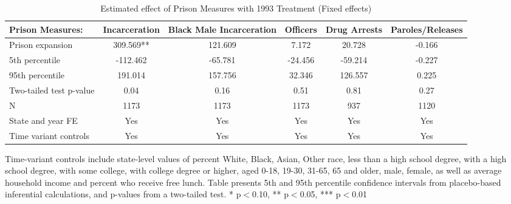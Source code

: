 \begin{table}[htbp]\centering
\scriptsize
\caption{Estimated effect of Prison Measures with 1993 Treatment (Fixed effects)}
\begin{center}
\begin{threeparttable}
\begin{tabular}{l*{5}{c}}
\toprule
\multicolumn{1}{l}{\textbf{Prison Measures:}}&
\multicolumn{1}{c}{\textbf{Incarceration}}&
\multicolumn{1}{c}{\textbf{Black Male Incarceration}}&
\multicolumn{1}{c}{\textbf{Officers}}&
\multicolumn{1}{c}{\textbf{Drug Arrests}}&
\multicolumn{1}{c}{\textbf{Paroles/Releases}}\\
\midrule
Prison expansion    &     309.569**   &     121.609   &       7.172   &      20.728   &      -0.166   \\
5th percentile      &    -112.462   &     -65.781   &     -24.456   &     -59.214   &      -0.227   \\
95th percentile     &     191.014   &     157.756   &      32.346   &     126.557   &       0.225   \\
Two-tailed test p-value&        0.04   &        0.16   &        0.51   &        0.81   &        0.27   \\
N                   &        1173   &        1173   &        1173   &         937   &        1120   \\
\midrule
State and year FE                              & Yes   & Yes   & Yes   & Yes   & Yes            \\
Time variant controls                  & Yes   & Yes   & Yes   & Yes   & Yes            \\
\bottomrule
\end{tabular}
\begin{tablenotes}
\tiny
\item Time-variant controls include state-level values of percent White, Black, Asian, Other race, less than a high school degree, with a high school degree, with some college, with college degree or higher, aged 0-18, 19-30, 31-65, 65 and older, male, female, as well as average household income and percent who receive free lunch.  Table presents 5th and 95th percentile confidence intervals from placebo-based inferential calculations, and p-values from a two-tailed test. * p$<$0.10, ** p$<$0.05, *** p$<$0.01
\end{tablenotes}
\end{threeparttable}
\end{center}
\end{table}
